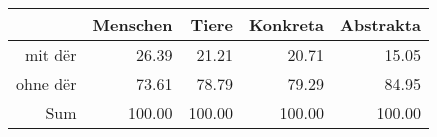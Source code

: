 \begin{tabular}{rrrrr}
  \hline
 & Menschen & Tiere & Konkreta & Abstrakta \\ 
  \hline
mit dër & 26.39 & 21.21 & 20.71 & 15.05 \\ 
  ohne dër & 73.61 & 78.79 & 79.29 & 84.95 \\ 
  Sum & 100.00 & 100.00 & 100.00 & 100.00 \\ 
   \hline
\end{tabular}

